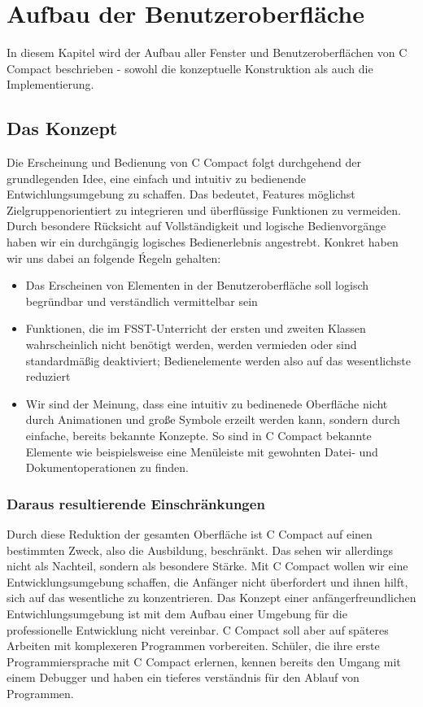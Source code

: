 

\chapter{Aufbau der Benutzeroberfläche}
In diesem Kapitel wird der Aufbau aller Fenster und Benutzeroberflächen von C Compact beschrieben - sowohl die konzeptuelle Konstruktion als auch die Implementierung.
\section{Das Konzept}
Die Erscheinung und Bedienung von C Compact folgt durchgehend der grundlegenden Idee, eine einfach und intuitiv zu bedienende Entwichlungsumgebung zu schaffen. Das bedeutet, Features möglichst Zielgruppenorientiert zu integrieren und überflüssige Funktionen zu vermeiden. Durch besondere Rücksicht auf Vollständigkeit und logische Bedienvorgänge haben wir ein durchgängig logisches Bedienerlebnis angestrebt.
Konkret haben wir uns dabei an folgende Ŕegeln gehalten:
\begin{itemize}
\item Das Erscheinen von Elementen in der Benutzeroberfläche soll logisch begründbar und verständlich vermittelbar sein
\item Funktionen, die im FSST-Unterricht der ersten und zweiten Klassen wahrscheinlich nicht benötigt werden, werden vermieden oder sind standardmäßig deaktiviert; Bedienelemente werden also auf das wesentlichste reduziert
\item Wir sind der Meinung, dass eine intuitiv zu bedinenede Oberfläche nicht durch Animationen und große Symbole erzeilt werden kann, sondern durch einfache, bereits bekannte Konzepte. So sind in C Compact bekannte Elemente wie beispielsweise eine Menüleiste mit gewohnten Datei- und Dokumentoperationen zu finden.
\end{itemize}

\subsection{Daraus resultierende Einschränkungen}
Durch diese Reduktion der gesamten Oberfläche ist C Compact auf einen bestimmten Zweck, also die Ausbildung, beschränkt. Das sehen wir allerdings nicht als Nachteil, sondern als besondere Stärke. Mit C Compact wollen wir eine Entwicklungsumgebung schaffen, die Anfänger nicht überfordert und ihnen hilft, sich auf das wesentliche zu konzentrieren.
Das Konzept einer anfängerfreundlichen Entwichlungsumgebung ist mit dem Aufbau einer Umgebung für die professionelle Entwicklung nicht vereinbar. C Compact soll aber auf späteres Arbeiten mit komplexeren Programmen vorbereiten. Schüler, die ihre erste Programmiersprache mit C Compact erlernen, kennen bereits den Umgang mit einem Debugger und haben ein tieferes verständnis für den Ablauf von Programmen.

